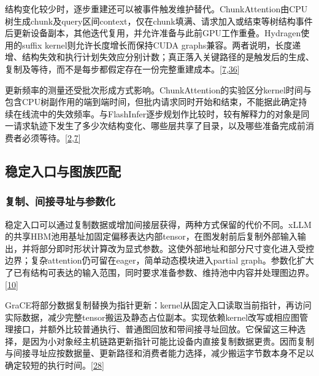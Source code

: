 \documentclass[
  UTF8,
  zihao=5]{ctexart}
\begin{document}
结构变化较少时，逐步重建还可以被事件触发维护替代。ChunkAttention由CPU树生成chunk及query区间context，仅在chunk填满、请求加入或结束等树结构事件后更新设备副本，其他迭代复用，并允许准备与此前GPU工作重叠。Hydragen使用的suffix
kernel则允许长度增长而保持CUDA
graphs兼容。两者说明，长度递增、结构失效和执行计划失效应分别计数；真正落入关键路径的是触发后的生成、复制及等待，而不是每步都假定存在一份完整重建成本。{[}\protect\hyperlink{ref-ye2024chunkattention}{7},\protect\hyperlink{ref-juravsky2024hydragen}{36}{]}

更新频率的测量还受批次形成方式影响。ChunkAttention的实验区分kernel时间与包含CPU树副作用的端到端时间，但批内请求同时开始和结束，不能据此确定持续在线流中的失效频率。与FlashInfer逐步规划作比较时，较有解释力的对象是同一请求轨迹下发生了多少次结构变化、哪些层共享了目录，以及哪些准备完成前消费者必须等待。{[}\protect\hyperlink{ref-ye2025flashinfer}{2},\protect\hyperlink{ref-ye2024chunkattention}{7}{]}

\hypertarget{ux7a33ux5b9aux5165ux53e3ux4e0eux56feux65cfux5339ux914d}{%
\subsection{稳定入口与图族匹配}\label{ux7a33ux5b9aux5165ux53e3ux4e0eux56feux65cfux5339ux914d}}

\hypertarget{ux590dux5236ux95f4ux63a5ux5bfbux5740ux4e0eux53c2ux6570ux5316}{%
\subsubsection{复制、间接寻址与参数化}\label{ux590dux5236ux95f4ux63a5ux5bfbux5740ux4e0eux53c2ux6570ux5316}}

稳定入口可以通过复制数据或增加间接层获得，两种方式保留的代价不同。xLLM的共享HBM池用基址加固定偏移表达内部tensor，在图发射前后复制外部输入输出，并将部分即时形状计算改为显式参数。这使外部地址和部分尺寸变化进入受控边界；复杂attention仍可留在eager，简单动态模块进入partial
graph。参数化扩大了已有结构可表达的输入范围，同时要求准备参数、维持池中内容并处理图边界。{[}\protect\hyperlink{ref-liu2025xllm}{10}{]}

GraCE将部分数据复制替换为指针更新：kernel从固定入口读取当前指针，再访问实际数据，减少完整tensor搬运及静态占位副本。实现依赖kernel改写或相应图管理接口，并额外比较普通执行、普通图回放和带间接寻址回放。它保留这三种选择，是因为小对象经主机链路更新指针可能比设备内直接复制数据更贵。因而复制与间接寻址应按数据量、更新路径和消费者能力选择，减少搬运字节数本身不足以确定较短的执行时间。{[}\protect\hyperlink{ref-ghosh2026grace}{28}{]}
\end{document}
